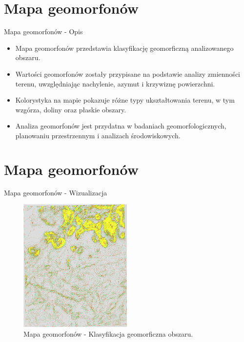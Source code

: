 \documentclass{beamer}
\begin{document}
\section{Mapa geomorfonów}

\begin{frame}{Mapa geomorfonów - Opis}
    \begin{itemize}
        \item Mapa geomorfonów przedstawia klasyfikację geomorficzną analizowanego obszaru.
        \item Wartości geomorfonów zostały przypisane na podstawie analizy zmienności terenu, uwzględniając nachylenie, azymut i krzywiznę powierzchni.
        \item Kolorystyka na mapie pokazuje różne typy ukształtowania terenu, w tym wzgórza, doliny oraz płaskie obszary.
        \item Analiza geomorfonów jest przydatna w badaniach geomorfologicznych, planowaniu przestrzennym i analizach środowiskowych.
    \end{itemize}
\end{frame}


\section{Mapa geomorfonów}
\begin{frame}{Mapa geomorfonów - Wizualizacja}
    \begin{figure}
        \centering
        \includegraphics[width=0.5\textwidth]{geo.png} %
        \caption{Mapa geomorfonów - Klasyfikacja geomorficzna obszaru.}
    \end{figure}
\end{frame}
\end{document}
